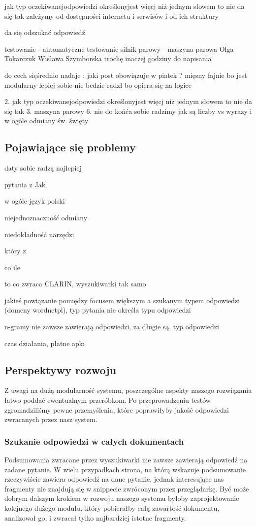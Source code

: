


jak typ oczekiwanejodpowiedzi określonyjest więcj niż jednym słowem to nie da się tak
zależymy od dostępności internetu i serwisów i od ich struktury

da się odszukać odpowiedź


testowanie - automatyczne testowanie 
silnik parowy - maszyna parowa
Olga Tokarczuk Wisława Szymborska
trochę inaczej godziny do napisania

do cech sięśrednio nadaje : jaki post obowiązuje w piatek ? mięsny 
fajnie bo jest modularny
lepiej sobie nie bedzie radzł bo opiera się na logice

2. jak typ oczekiwanejodpowiedzi określonyjest więcj niż jednym słowem to nie da się tak
3. maszyna parowy 
6. nie do końća sobie radzimy jak są liczby vs wyrazy i w ogóle odmiany św. święty



\subsection{Pojawiające się problemy}

daty sobie radzą najlepiej 

pytania z Jak

w ogóle język polski

niejednoznaczność odmiany

niedokładność narzędzi

który z 

co ile

to co zwraca CLARIN, wyszukiwarki tak samo

jakieś powiązanie pomiędzy focusem większym a szukanym typem odpowiedzi (domeny wordnetpl),
typ pytania nie określa typu odpowiedzi

n-gramy nie zawsze zawierają odpowiedzi, za długie są, typ odpowiedzi 

czas działania, płatne apki

\subsection{Perspektywy rozwoju}
Z uwagi na dużą modularność systemu, poszczególne aspekty naszego rozwiązania łatwo poddać ewentualnym przeróbkom. Po przeprowadzeniu testów zgromadziliśmy pewne przemyślenia, które poprawiłyby jakość odpowiedzi zwracanych przez nasz system. 

\subsubsection{Szukanie odpowiedzi w całych dokumentach}
Podsumowania zwracane przez wyszukiwarki nie zawsze zawierają odpowiedź na zadane pytanie. W wielu przypadkach strona, na którą wskazuje podsumowanie rzeczywiście zawiera odpowiedź na dane pytanie, jednak interesujące nas fragmenty nie znajdują się w snippecie zwróconym przez przeglądarkę. Być może dobrym dalszym krokiem w rozwoju naszego systemu byłoby zaprojektowanie kolejnego dużego modułu, który pobierałby całą zawartość dokumentu, analizował go, i zwracał tylko najbardziej istotne fragmenty.

